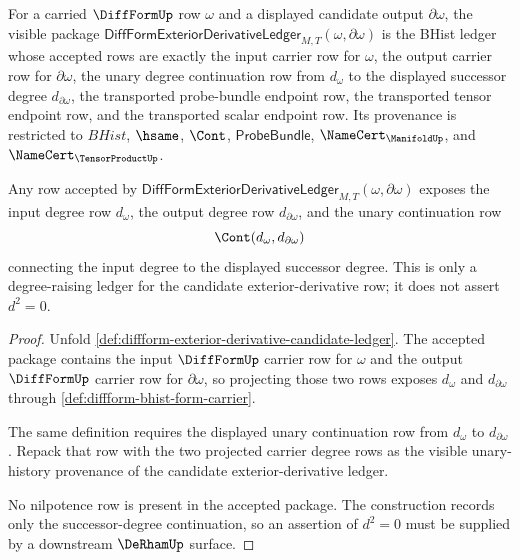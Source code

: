 \begin{definition}
\label{def:diffform-exterior-derivative-candidate-ledger}
For a carried $\DiffFormUp$ row $\omega$ and a displayed candidate output
$\partial\omega$, the visible package
$\mathsf{DiffFormExteriorDerivativeLedger}_{M,T}(\omega,\partial\omega)$ is the
BHist ledger whose accepted rows are exactly the input carrier row for
$\omega$, the output carrier row for $\partial\omega$, the unary degree
continuation row from $d_\omega$ to the displayed successor degree
$d_{\partial\omega}$, the transported probe-bundle endpoint row, the
transported tensor endpoint row, and the transported scalar endpoint row. Its
provenance is restricted to $BHist$, $\hsame$, $\Cont$,
$\mathsf{ProbeBundle}$, $\NameCert_{\ManifoldUp}$, and
$\NameCert_{\TensorProductUp}$.
\end{definition}

\begin{theorem}
\label{thm:diffform-exterior-derivative-degree-raise-ledger}
Any row accepted by
$\mathsf{DiffFormExteriorDerivativeLedger}_{M,T}(\omega,\partial\omega)$
exposes the input degree row $d_\omega$, the output degree row
$d_{\partial\omega}$, and the unary continuation row
$$
\Cont(d_\omega,d_{\partial\omega})
$$
connecting the input degree to the displayed successor degree. This is only a
degree-raising ledger for the candidate exterior-derivative row; it does not
assert $d^2=0$.
\end{theorem}
\begin{proof}
Unfold \autoref{def:diffform-exterior-derivative-candidate-ledger}. The
accepted package contains the input $\DiffFormUp$ carrier row for $\omega$ and
the output $\DiffFormUp$ carrier row for $\partial\omega$, so projecting those
two rows exposes $d_\omega$ and $d_{\partial\omega}$ through
\autoref{def:diffform-bhist-form-carrier}.

The same definition requires the displayed unary continuation row from
$d_\omega$ to $d_{\partial\omega}$. Repack that row with the two projected
carrier degree rows as the visible unary-history provenance of the candidate
exterior-derivative ledger.

No nilpotence row is present in the accepted package. The construction records
only the successor-degree continuation, so an assertion of $d^2=0$ must be
supplied by a downstream $\DeRhamUp$ surface.
\end{proof}

